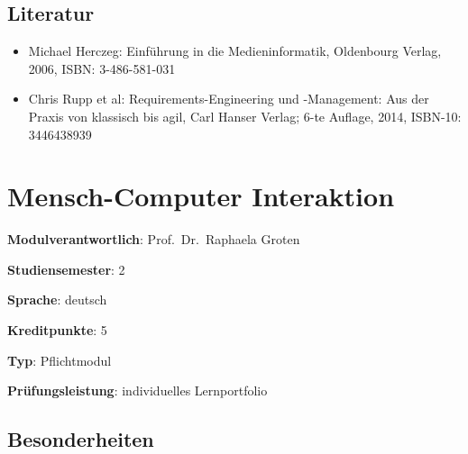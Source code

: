 \hypertarget{literaturpathlabel....srcmodulbeschreibungen-bachelor-bpo5ba_medienprojekt}{%
\section*{Literatur\label{../../src/modulbeschreibungen-bachelor-bpo5/BA_Medienprojekt}}\label{literaturpathlabel....srcmodulbeschreibungen-bachelor-bpo5ba_medienprojekt}}

\begin{itemize}
\tightlist
\item
  Michael Herczeg: Einführung in die Medieninformatik, Oldenbourg
  Verlag, 2006, ISBN: 3-486-581-031
\item
  Chris Rupp et al: Requirements-Engineering und -Management: Aus der
  Praxis von klassisch bis agil, Carl Hanser Verlag; 6-te Auflage, 2014,
  ISBN-10: 3446438939
\end{itemize}

\hypertarget{mensch-computer-interaktionpathlabel....srcmodulbeschreibungen-bachelor-bpo5ba_mensch-computer_interaktion}{%
\chapter{Mensch-Computer
Interaktion\label{../../src/modulbeschreibungen-bachelor-bpo5/BA_Mensch-Computer_Interaktion}}\label{mensch-computer-interaktionpathlabel....srcmodulbeschreibungen-bachelor-bpo5ba_mensch-computer_interaktion}}

\begin{modulHead}
\textbf{Modulverantwortlich}: Prof.~Dr.~Raphaela
Groten
\end{modulHead}
\begin{modulHead}
\textbf{Studiensemester}:
2
\end{modulHead}
\begin{modulHead}
\textbf{Sprache}:
deutsch
\end{modulHead}
\begin{modulHead}
\textbf{Kreditpunkte}:
5
\end{modulHead}
\begin{modulHead}
\textbf{Typ}:
Pflichtmodul
\end{modulHead}
\begin{modulHead}
\textbf{Prüfungsleistung}:
individuelles Lernportfolio
\end{modulHead}


\hypertarget{besonderheitenpathlabel....srcmodulbeschreibungen-bachelor-bpo5ba_mensch-computer_interaktion}{%
\section*{Besonderheiten\label{../../src/modulbeschreibungen-bachelor-bpo5/BA_Mensch-Computer_Interaktion}}\label{besonderheitenpathlabel....srcmodulbeschreibungen-bachelor-bpo5ba_mensch-computer_interaktion}}

